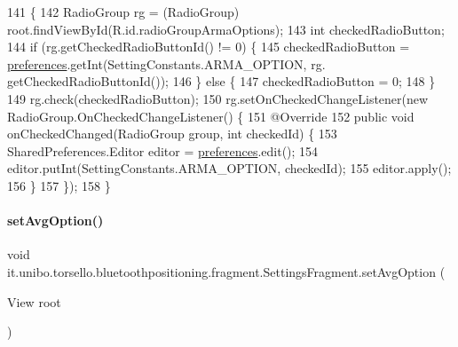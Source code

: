 \begin{DoxyCode}
141                                           \{
142         RadioGroup rg = (RadioGroup) root.findViewById(R.id.radioGroupArmaOptions);
143         \textcolor{keywordtype}{int} checkedRadioButton;
144         \textcolor{keywordflow}{if} (rg.getCheckedRadioButtonId() != 0) \{
145             checkedRadioButton = \hyperlink{classit_1_1unibo_1_1torsello_1_1bluetoothpositioning_1_1fragment_1_1SettingsFragment_a52480c4d5d81ca59fe4a98ae3c623ea4_a52480c4d5d81ca59fe4a98ae3c623ea4}{preferences}.getInt(SettingConstants.ARMA\_OPTION, rg.
      getCheckedRadioButtonId());
146         \} \textcolor{keywordflow}{else} \{
147             checkedRadioButton = 0;
148         \}
149         rg.check(checkedRadioButton);
150         rg.setOnCheckedChangeListener(\textcolor{keyword}{new} RadioGroup.OnCheckedChangeListener() \{
151             @Override
152             \textcolor{keyword}{public} \textcolor{keywordtype}{void} onCheckedChanged(RadioGroup group, \textcolor{keywordtype}{int} checkedId) \{
153                 SharedPreferences.Editor editor = \hyperlink{classit_1_1unibo_1_1torsello_1_1bluetoothpositioning_1_1fragment_1_1SettingsFragment_a52480c4d5d81ca59fe4a98ae3c623ea4_a52480c4d5d81ca59fe4a98ae3c623ea4}{preferences}.edit();
154                 editor.putInt(SettingConstants.ARMA\_OPTION, checkedId);
155                 editor.apply();
156             \}
157         \});
158     \}
\end{DoxyCode}
\hypertarget{classit_1_1unibo_1_1torsello_1_1bluetoothpositioning_1_1fragment_1_1SettingsFragment_a0f26c84f3a3dfffabfed1db04303b8b0_a0f26c84f3a3dfffabfed1db04303b8b0}{}\label{classit_1_1unibo_1_1torsello_1_1bluetoothpositioning_1_1fragment_1_1SettingsFragment_a0f26c84f3a3dfffabfed1db04303b8b0_a0f26c84f3a3dfffabfed1db04303b8b0} 
\paragraph{\texorpdfstring{set\+Avg\+Option()}{setAvgOption()}}
{\footnotesize\ttfamily void it.\+unibo.\+torsello.\+bluetoothpositioning.\+fragment.\+Settings\+Fragment.\+set\+Avg\+Option (\begin{DoxyParamCaption}\item[{View}]{root }\end{DoxyParamCaption})\hspace{0.3cm}{\ttfamily [private]}}


